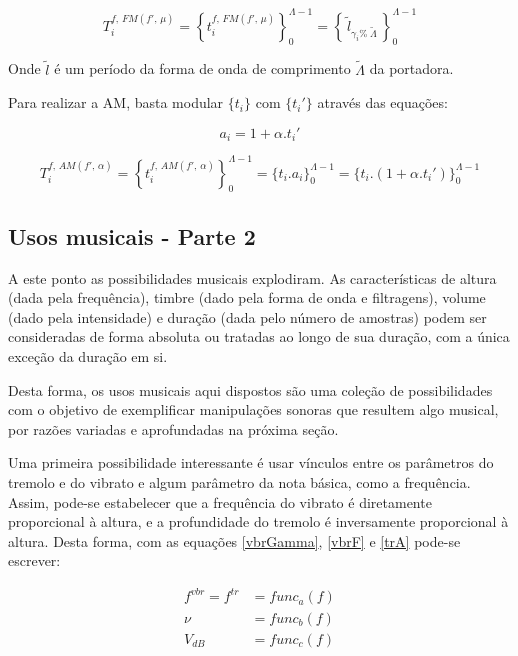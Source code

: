 \begin{equation}\label{fmT}
T_i^{f,\, FM(f',\,\mu)}=\left\{ t_i^{f,\,FM(f',\,\mu)} \right\}_0^{\Lambda-1}=\left\{\,\widetilde{l}_{\gamma_i \%\; \widetilde{\Lambda} } \,\right\}_0^{\Lambda-1}
\end{equation}

Onde $\widetilde{l}$ é um período da forma de onda de comprimento $\widetilde{\Lambda}$ da portadora.

Para realizar a AM, basta modular $\{t_i\}$ com $\{t_i'\}$ através das equações:

\begin{equation}\label{amA}
a_i=1 + \alpha . t_i'
\end{equation}

\begin{equation}\label{trT}
T_i^{f,\,AM(f',\,\alpha)}=\left\{ t_i^{f,\,AM(f',\,\alpha)} \right\}_0^{\Lambda-1}=\{ t_i . a_i \}_0^{\Lambda-1}=\{t_i . (1 + \alpha . t_i')    \}_0^{\Lambda-1}
\end{equation}



\subsection{Usos musicais - Parte 2}
A este ponto as possibilidades musicais explodiram. As
características de altura (dada pela frequência),
timbre (dado pela forma de onda e filtragens),
volume (dado pela intensidade) e duração (dada pelo número de amostras)
podem ser consideradas
de forma absoluta ou tratadas ao longo de sua duração,
com a única exceção da duração em si.

Desta forma, os usos musicais aqui dispostos são uma coleção de possibilidades
com o objetivo de exemplificar manipulações sonoras que resultem algo
musical, por razões variadas e aprofundadas na próxima seção.

Uma primeira possibilidade interessante é usar vínculos
entre os parâmetros do tremolo e do vibrato e algum parâmetro da nota básica,
como a frequência. Assim, pode-se estabelecer que
a frequência do vibrato é diretamente proporcional à altura, e a profundidade do tremolo é inversamente proporcional
à altura.
Desta forma, com as equações \ref{vbrGamma}, \ref{vbrF} e \ref{trA}
pode-se escrever:

\begin{equation}
\begin{split}
f^{vbr} = f^{tr} & = func_a(f) \\
\nu & = func_b(f) \\
V_{dB} & = func_c(f)
\end{split}
\end{equation}

